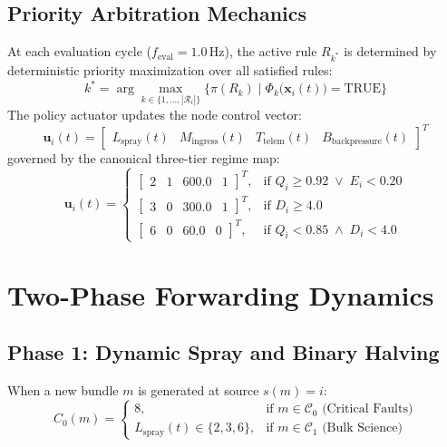 \documentclass[journal,compsoc]{IEEEtran}
\begin{document}
\subsection{Priority Arbitration Mechanics}
At each evaluation cycle ($f_{\mathrm{eval}} = 1.0\,\mathrm{Hz}$), the active rule $R_{k^*}$ is determined by deterministic priority maximization over all satisfied rules:
\begin{equation}
k^* = \arg\max_{k \in \{1, \dots, |\mathcal{R}_i|\}} \bigl\{ \pi(R_k) \;\big|\; \Phi_k\bigl(\mathbf{x}_i(t)\bigr) = \mathrm{TRUE} \bigr\}
\end{equation}
The policy actuator updates the node control vector:
\begin{equation}
\mathbf{u}_i(t) = \begin{bmatrix}
L_{\mathrm{spray}}(t) & M_{\mathrm{ingress}}(t) & T_{\mathrm{telem}}(t) & B_{\mathrm{backpressure}}(t)
\end{bmatrix}^T
\end{equation}
governed by the canonical three-tier regime map:
\begin{equation}
\mathbf{u}_i(t) = \begin{cases}
\begin{bmatrix} 2 & 1 & 600.0 & 1 \end{bmatrix}^T, & \text{if } Q_i \ge 0.92 \;\lor\; E_i < 0.20 \\[4pt]
\begin{bmatrix} 3 & 0 & 300.0 & 1 \end{bmatrix}^T, & \text{if } D_i \ge 4.0 \\[4pt]
\begin{bmatrix} 6 & 0 & 60.0 & 0 \end{bmatrix}^T, & \text{if } Q_i < 0.85 \;\land\; D_i < 4.0
\end{cases}
\end{equation}

\section{Two-Phase Forwarding Dynamics}

\subsection{Phase 1: Dynamic Spray and Binary Halving}
When a new bundle $m$ is generated at source $s(m) = i$:
\begin{equation}
C_0(m) = \begin{cases}
8, & \text{if } m \in \mathcal{C}_0 \text{ (Critical Faults)} \\
L_{\mathrm{spray}}(t) \in \{2, 3, 6\}, & \text{if } m \in \mathcal{C}_1 \text{ (Bulk Science)}
\end{cases}
\end{equation}
\end{document}
